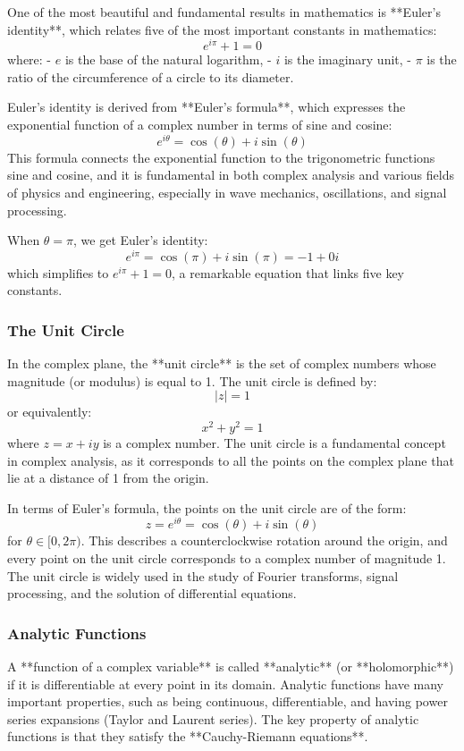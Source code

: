 \documentclass{article}
\begin{document}
One of the most beautiful and fundamental results in mathematics is **Euler’s identity**, which relates five of the most important constants in mathematics:
\[
e^{i\pi} + 1 = 0
\]
where:
- \( e \) is the base of the natural logarithm,
- \( i \) is the imaginary unit,
- \( \pi \) is the ratio of the circumference of a circle to its diameter.

Euler’s identity is derived from **Euler’s formula**, which expresses the exponential function of a complex number in terms of sine and cosine:
\[
e^{i\theta} = \cos(\theta) + i\sin(\theta)
\]
This formula connects the exponential function to the trigonometric functions sine and cosine, and it is fundamental in both complex analysis and various fields of physics and engineering, especially in wave mechanics, oscillations, and signal processing.

When \( \theta = \pi \), we get Euler’s identity:
\[
e^{i\pi} = \cos(\pi) + i\sin(\pi) = -1 + 0i
\]
which simplifies to \( e^{i\pi} + 1 = 0 \), a remarkable equation that links five key constants.

\subsubsection*{The Unit Circle}

In the complex plane, the **unit circle** is the set of complex numbers whose magnitude (or modulus) is equal to 1. The unit circle is defined by:
\[
|z| = 1
\]
or equivalently:
\[
x^2 + y^2 = 1
\]
where \( z = x + iy \) is a complex number. The unit circle is a fundamental concept in complex analysis, as it corresponds to all the points on the complex plane that lie at a distance of 1 from the origin. 

In terms of Euler’s formula, the points on the unit circle are of the form:
\[
z = e^{i\theta} = \cos(\theta) + i\sin(\theta)
\]
for \( \theta \in [0, 2\pi) \). This describes a counterclockwise rotation around the origin, and every point on the unit circle corresponds to a complex number of magnitude 1. The unit circle is widely used in the study of Fourier transforms, signal processing, and the solution of differential equations.

\subsubsection*{Analytic Functions}

A **function of a complex variable** is called **analytic** (or **holomorphic**) if it is differentiable at every point in its domain. Analytic functions have many important properties, such as being continuous, differentiable, and having power series expansions (Taylor and Laurent series). The key property of analytic functions is that they satisfy the **Cauchy-Riemann equations**.
\end{document}
